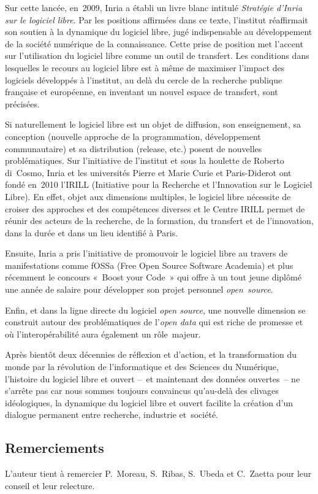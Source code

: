 \documentclass{FramateX}
\begin{document}
\begin{refsection}
\bigskip

Sur cette lancée, en~2009, Inria a établi un livre blanc intitulé
\textit{Stratégie d'Inria sur le logiciel libre}. Par les
positions affirmées dans ce texte, l'institut réaffirmait son soutien à
la dynamique du logiciel libre, jugé indispensable au développement de
la société numérique de la connaissance. Cette prise de position met
l'accent sur l'utilisation du logiciel libre comme un outil de
transfert. Les conditions dans lesquelles le recours au logiciel libre
est à même de maximiser l'impact des logiciels développés à l'institut,
au delà du cercle de la recherche publique française et européenne, en
inventant un nouvel espace de transfert, sont précisées.

Si naturellement le logiciel libre est un objet de diffusion, son
enseignement, sa conception (nouvelle approche de la programmation,
développement communautaire) et sa distribution (release, etc.) posent
de nouvelles problématiques. Sur l'initiative de l'institut et sous la
houlette de Roberto di~Cosmo, Inria et les universités Pierre et Marie
Curie et Paris-Diderot ont fondé en~2010 l'IRILL (Initiative pour la
Recherche et l'Innovation sur le Logiciel Libre). En effet, objet aux
dimensions multiples, le logiciel libre nécessite de croiser des
approches et des compétences diverses et le Centre IRILL permet de
réunir des acteurs de la recherche, de la formation, du transfert et de
l'innovation, dans la durée et dans un lieu identifié à Paris.

Ensuite, Inria a pris l'initiative de promouvoir le logiciel libre au
travers de manifestations comme fOSSa (Free Open Source Software
Academia) et plus récemment le concours «~Boost your Code~» qui offre à
un tout jeune diplômé une année de salaire pour développer son projet
personnel \textit{open~source}.

Enfin, et dans la ligne directe du logiciel \textit{open source}, une
nouvelle dimension se construit autour des problématiques de
l'\textit{open data} qui est riche de promesse et où l'interopérabilité
aura également un rôle~majeur.

Après bientôt deux décennies de réflexion et d'action, et la
transformation du monde par la révolution de l'informatique et des
Sciences du Numérique, l'histoire du logiciel libre et ouvert –~et
maintenant des données ouvertes~– ne s'arrête pas car nous sommes
toujours convaincus qu'au-delà des clivages
idéologiques, la dynamique du logiciel libre et ouvert facilite la
création d'un dialogue permanent entre recherche, industrie
et~société.


\subsection*{Remerciements}
{}

L'auteur tient à remercier P.~Moreau, S.~Ribas, S.~Ubeda et C.~Zaetta pour leur conseil et leur relecture.








\end{refsection}
\end{document}
